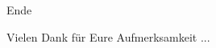 \documentclass[12pt,hyperref={pdfpagelabels=false},notes=show]{beamer}
\begin{document}







%

\section*{}
\begin{frame}{Ende}
    \begin{center}
        Vielen Dank für Eure Aufmerksamkeit	...
     \end{center}
\end{frame}\addtocounter{framenumber}{-1}
	
\section*{}


\end{document}
